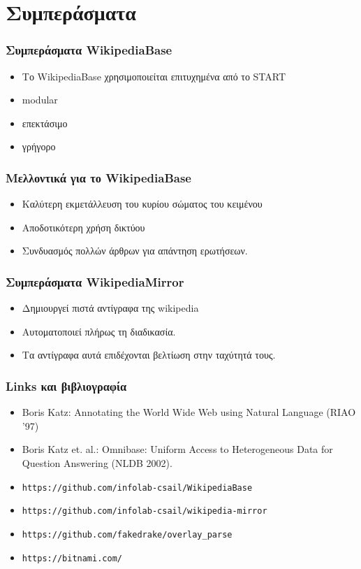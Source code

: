 \documentclass[bigger]{beamer}
\begin{document}
\section{Συμπεράσματα}

\begin{frame}
  \frametitle{Συμπεράσματα WikipediaBase}

  \begin{itemize}
  \item Το WikipediaBase χρησιμοποιείται επιτυχημένα από το START
  \item modular
  \item επεκτάσιμο
  \item γρήγορο
  \end{itemize}
\end{frame}

\begin{frame}
  \frametitle{Μελλοντικά για το WikipediaBase}
  \begin{itemize}
  \item Καλύτερη εκμετάλλευση του κυρίου σώματος του κειμένου
  \item Αποδοτικότερη χρήση δικτύου
  \item Συνδυασμός πολλών άρθρων για απάντηση ερωτήσεων.
  \end{itemize}
\end{frame}

\begin{frame}
  \frametitle{Συμπεράσματα WikipediaMirror}

  \begin{itemize}
  \item Δημιουργεί πιστά αντίγραφα της wikipedia
  \item Αυτοματοποιεί πλήρως τη διαδικασία.
  \item Τα αντίγραφα αυτά επιδέχονται βελτίωση στην ταχύτητά τους.
  \end{itemize}
\end{frame}

\begin{frame}
  \frametitle{Links και βιβλιογραφία}
  \begin{itemize}
  \item Boris Katz: Annotating the World Wide Web using Natural Language (RIAO ’97)
  \item Boris Katz et. al.: Omnibase: Uniform Access to Heterogeneous
    Data for Question Answering (NLDB 2002).
  \item \texttt{https://github.com/infolab-csail/WikipediaBase}
  \item \texttt{https://github.com/infolab-csail/wikipedia-mirror}
  \item \texttt{https://github.com/fakedrake/overlay\_parse}
  \item \texttt{https://bitnami.com/}
  \end{itemize}
\end{frame}
\end{document}

